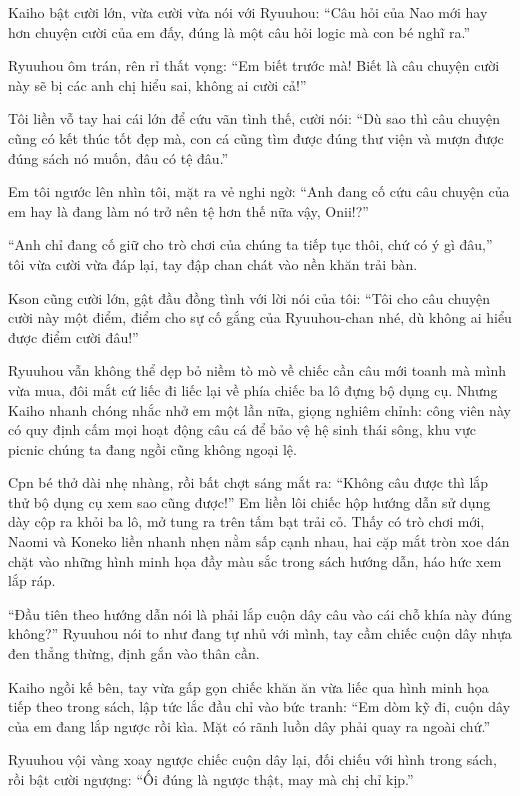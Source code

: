 ﻿\documentclass[../main.tex]{subfiles}
\begin{document}
Kaiho bật cười lớn, vừa cười vừa nói với Ryuuhou: ``Câu hỏi của Nao mới hay hơn chuyện cười của em đấy, đúng là một câu hỏi logic mà con bé nghĩ ra.''

Ryuuhou ôm trán, rên rỉ thất vọng: ``Em biết trước mà! Biết là câu chuyện cười này sẽ bị các anh chị hiểu sai, không ai cười cả!''

Tôi liền vỗ tay hai cái lớn để cứu vãn tình thế, cười nói: ``Dù sao thì câu chuyện cũng có kết thúc tốt đẹp mà, con cá cũng tìm được đúng thư viện và mượn được đúng sách nó muốn, đâu có tệ đâu.''

Em tôi ngước lên nhìn tôi, mặt ra vẻ nghi ngờ: ``Anh đang cố cứu câu chuyện của em hay là đang làm nó trở nên tệ hơn thế nữa vậy, Onii!?''

``Anh chỉ đang cố giữ cho trò chơi của chúng ta tiếp tục thôi, chứ có ý gì đâu,'' tôi vừa cười vừa đáp lại, tay đập chan chát vào nền khăn trải bàn.

Kson cũng cười lớn, gật đầu đồng tình với lời nói của tôi: ``Tôi cho câu chuyện cười này một điểm, điểm cho sự cố gắng của Ryuuhou-chan nhé, dù không ai hiểu được điểm cười đâu!''

\ct

Ryuuhou vẫn không thể dẹp bỏ niềm tò mò về chiếc cần câu mới toanh mà mình vừa mua, đôi mắt cứ liếc đi liếc lại về phía chiếc ba lô đựng bộ dụng cụ. Nhưng Kaiho nhanh chóng nhắc nhở em một lần nữa, giọng nghiêm chỉnh: công viên này có quy định cấm mọi hoạt động câu cá để bảo vệ hệ sinh thái sông, khu vực picnic chúng ta đang ngồi cũng không ngoại lệ.

Cpn bé thở dài nhẹ nhàng, rồi bất chợt sáng mắt ra: ``Không câu được thì lắp thử bộ dụng cụ xem sao cũng được!'' Em liền lôi chiếc hộp hướng dẫn sử dụng dày cộp ra khỏi ba lô, mở tung ra trên tấm bạt trải cỏ. Thấy có trò chơi mới, Naomi và Koneko liền nhanh nhẹn nằm sấp cạnh nhau, hai cặp mắt tròn xoe dán chặt vào những hình minh họa đầy màu sắc trong sách hướng dẫn, háo hức xem lắp ráp.

``Đầu tiên theo hướng dẫn nói là phải lắp cuộn dây câu vào cái chỗ khía này đúng không?'' Ryuuhou nói to như đang tự nhủ với mình, tay cầm chiếc cuộn dây nhựa đen thẳng thừng, định gắn vào thân cần.

Kaiho ngồi kế bên, tay vừa gấp gọn chiếc khăn ăn vừa liếc qua hình minh họa tiếp theo trong sách, lập tức lắc đầu chỉ vào bức tranh: ``Em dòm kỹ đi, cuộn dây của em đang lắp ngược rồi kìa. Mặt có rãnh luồn dây phải quay ra ngoài chứ.''

Ryuuhou vội vàng xoay ngược chiếc cuộn dây lại, đối chiếu với hình trong sách, rồi bật cười ngượng: ``Ối đúng là ngược thật, may mà chị chỉ kịp.''
\end{document}
